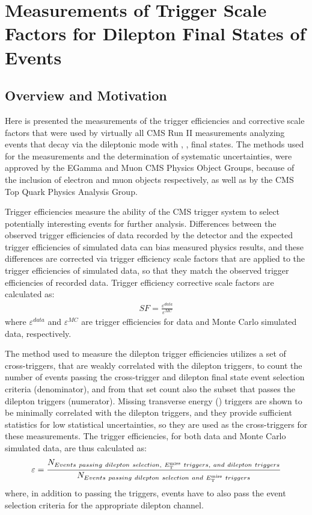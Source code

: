 
\chapter{Measurements of Trigger Scale Factors for Dilepton Final States of \ttbar Events}

\section{Overview and Motivation}
Here is presented the measurements of the trigger efficiencies and corrective scale factors that were used by virtually all CMS Run II measurements analyzing \ttbar events that decay via the dileptonic mode with \ee, \emu, \mumu final states.  
The methods used for the measurements and the determination of systematic uncertainties, were approved by the EGamma and Muon CMS Physics Object Groups, because of the inclusion of electron and muon objects respectively, as well as by the CMS Top Quark Physics Analysis Group.

Trigger efficiencies measure the ability of the CMS trigger system to select potentially interesting events for further analysis.
Differences between the observed trigger efficiencies of data recorded by the detector and the expected trigger efficiencies of simulated data can bias measured physics results, and these differences are corrected via trigger efficiency scale factors that are applied to the trigger efficiencies of simulated data, so that they match the observed trigger efficiencies of recorded data.
Trigger efficiency corrective scale factors are calculated as:
\begin{eqnarray}
SF = \frac{\varepsilon^{data}}{\varepsilon^{MC}}
\label{SF}
\end{eqnarray}
where $\varepsilon^{data}$ and $\varepsilon^{MC}$ are trigger efficiencies for data and Monte Carlo simulated data, respectively.

The method used to measure the dilepton trigger efficiencies utilizes a set of cross-triggers, that are weakly correlated with the dilepton triggers, to count the number of events passing the cross-trigger and \ttbar dilepton final state event selection criteria (denominator), and from that set count also the subset that passes the dilepton triggers (numerator).
Missing transverse energy (\MET) triggers are shown to be minimally correlated with the dilepton triggers, and they provide sufficient statistics for low statistical uncertainties, so they are used as the cross-triggers for these measurements. 
The trigger efficiencies, for both data and Monte Carlo simulated data, are thus calculated as: 
\begin{eqnarray}
\varepsilon = \frac{N_{Events ~passing ~dilepton ~selection, ~E_{\mathrm{T}}^{\text{miss}} ~triggers, ~and ~dilepton ~triggers}}{N_{Events ~passing ~dilepton ~selection ~and ~E_{\mathrm{T}}^{\text{miss}} ~triggers}}
\label{efficiency}
\end{eqnarray}
where, in addition to passing the triggers, events have to also pass the event selection criteria for the appropriate dilepton channel. 

